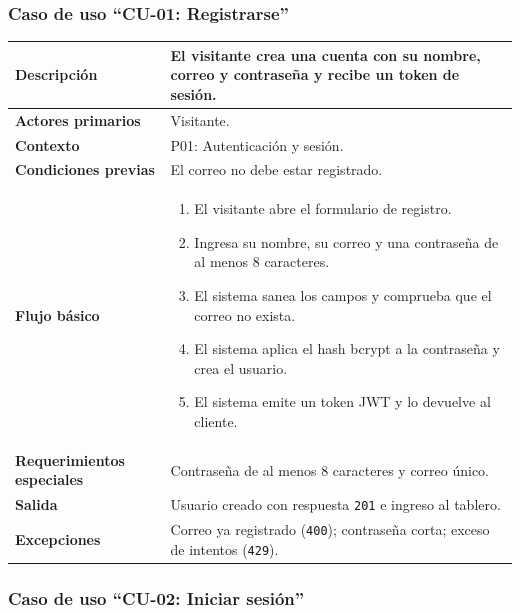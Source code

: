 \documentclass[doc,12pt,a4paper]{apa7}
\begin{document}
\subsubsection{Caso de uso ``CU-01: Registrarse''}

\begin{longtable}{|P{3.3cm}|L{11.2cm}|}
\hline
\textbf{Descripción} & El visitante crea una cuenta con su nombre, correo y contraseña y recibe un token de sesión. \\ \hline
\textbf{Actores primarios} & Visitante. \\ \hline
\textbf{Contexto} & P01: Autenticación y sesión. \\ \hline
\textbf{Condiciones previas} & El correo no debe estar registrado. \\ \hline
\textbf{Flujo básico} &
\begin{enumerate}
    \item El visitante abre el formulario de registro.
    \item Ingresa su nombre, su correo y una contraseña de al menos 8 caracteres.
    \item El sistema sanea los campos y comprueba que el correo no exista.
    \item El sistema aplica el hash bcrypt a la contraseña y crea el usuario.
    \item El sistema emite un token JWT y lo devuelve al cliente.
\end{enumerate} \\ \hline
\textbf{Requerimientos especiales} & Contraseña de al menos 8 caracteres y correo único. \\ \hline
\textbf{Salida} & Usuario creado con respuesta \texttt{201} e ingreso al tablero. \\ \hline
\textbf{Excepciones} & Correo ya registrado (\texttt{400}); contraseña corta; exceso de intentos (\texttt{429}). \\ \hline
\end{longtable}

\subsubsection{Caso de uso ``CU-02: Iniciar sesión''}
\end{document}
